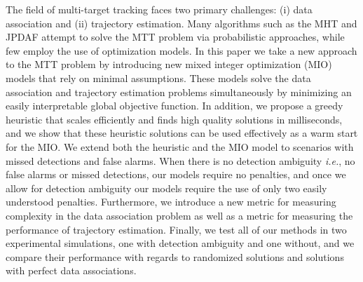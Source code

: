The field of multi-target tracking faces two primary challenges: (i) data association and (ii) trajectory estimation. Many algorithms such as the MHT and JPDAF attempt to solve the MTT problem via probabilistic approaches, while few employ the use of optimization models. In this paper we take a new approach to the MTT problem by introducing new mixed integer optimization (MIO) models that rely on minimal assumptions. These models solve the data association and trajectory estimation problems simultaneously by minimizing an easily interpretable global objective function. In addition, we propose a greedy heuristic that scales efficiently and finds high quality solutions in milliseconds, and we show that these heuristic solutions can be used effectively as a warm start for the MIO.  We extend both the heuristic and the MIO model to scenarios with missed detections and false alarms. When there is no detection ambiguity \textit{i.e.}, no false alarms or missed detections, our models require no penalties, and once we allow for detection ambiguity our models require the use of only two easily understood penalties. Furthermore, we introduce a new metric for measuring complexity in the data association problem as well as a metric for measuring the performance of trajectory estimation. Finally, we test all of our methods in two experimental simulations, one with detection ambiguity and one without, and  we compare their performance with regards to randomized solutions and solutions with perfect data associations. 